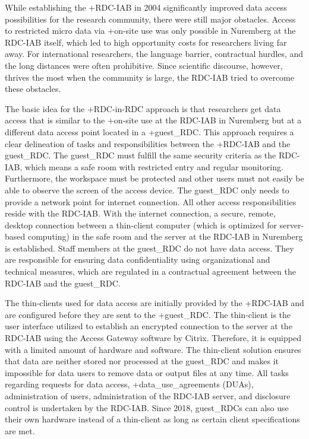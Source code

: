 \documentclass[
]{WileySix}
\begin{document}
While establishing the +RDC-IAB\textbar{} in 2004 significantly improved data access possibilities for the research community, there were still major obstacles. Access to restricted micro data via +on-site\textbar{} use was only possible in Nuremberg at the RDC-IAB itself, which led to high opportunity costs for researchers living far away. For international researchers, the language barrier, contractual hurdles, and the long distances were often prohibitive. Since scientific discourse, however, thrives the most when the community is large, the RDC-IAB tried to overcome these obstacles.

The basic idea for the +RDC-in-RDC\textbar{} approach is that researchers get data access that is similar to the +on-site\textbar{} use at the RDC-IAB in Nuremberg but at a different data access point located in a +guest\_RDC\textbar. This approach requires a clear delineation of tasks and responsibilities between the +RDC-IAB\textbar{} and the guest\_RDC. The guest\_RDC must fulfill the same security criteria as the RDC-IAB, which means a safe room with restricted entry and regular monitoring. Furthermore, the workspace must be protected and other users must not easily be able to observe the screen of the access device. The guest\_RDC only needs to provide a network point for internet connection. All other access responsibilities reside with the RDC-IAB. With the internet connection, a secure, remote, desktop connection between a thin-client computer (which is optimized for server-based computing) in the safe room and the server at the RDC-IAB in Nuremberg is established. Staff members at the guest\_RDC do not have data access. They are responsible for ensuring data confidentiality using organizational and technical measures, which are regulated in a contractual agreement between the RDC-IAB and the guest\_RDC.

The thin-clients used for data access are initially provided by the +RDC-IAB\textbar{} and are configured before they are sent to the +guest\_RDC\textbar. The thin-client is the user interface utilized to establish an encrypted connection to the server at the RDC-IAB using the Access Gateway software by Citrix. Therefore, it is equipped with a limited amount of hardware and software. The thin-client solution ensures that data are neither stored nor processed at the guest\_RDC and makes it impossible for data users to remove data or output files at any time. All tasks regarding requests for data access, +data\_use\_agreements\textbar{} (DUAs), administration of users, administration of the RDC-IAB server, and disclosure control is undertaken by the RDC-IAB. Since 2018, guest\_RDCs can also use their own hardware instead of a thin-client as long as certain client specifications are met.
\end{document}
